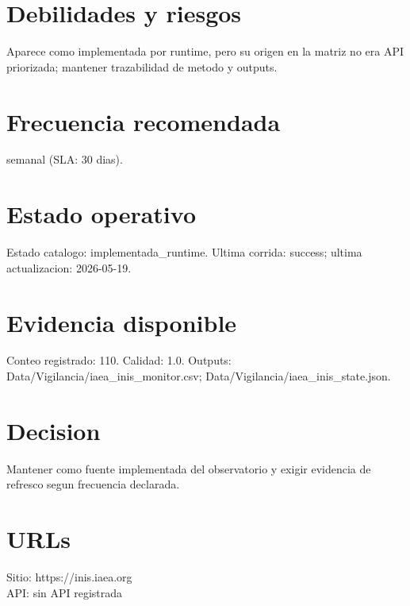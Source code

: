 \documentclass[10pt,a4paper]{article}
\begin{document}
\section*{Debilidades y riesgos}
Aparece como implementada por runtime, pero su origen en la matriz no era API priorizada; mantener trazabilidad de metodo y outputs.

\section*{Frecuencia recomendada}
semanal (SLA: 30 dias).

\section*{Estado operativo}
Estado catalogo: implementada\_runtime. Ultima corrida: success; ultima actualizacion: 2026-05-19.

\section*{Evidencia disponible}
Conteo registrado: 110. Calidad: 1.0. Outputs: Data/Vigilancia/iaea\_inis\_monitor.csv; Data/Vigilancia/iaea\_inis\_state.json.

\section*{Decision}
Mantener como fuente implementada del observatorio y exigir evidencia de refresco segun frecuencia declarada.


\section*{URLs}
Sitio: https://inis.iaea.org\\
API: sin API registrada
\end{document}
